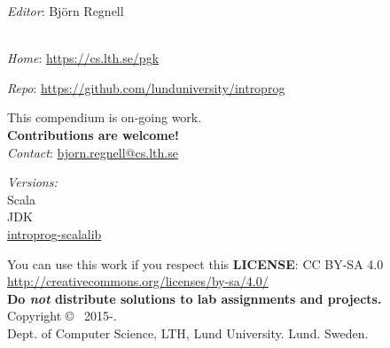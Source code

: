 
\clearpage\null\thispagestyle{empty}
\vfill

{
\setlength{\parindent}{0pt}
\emph{Editor}: Björn Regnell \\


\\ \newline

\emph{Home}: \url{https://cs.lth.se/pgk} \newline

\emph{Repo}: \url{https://github.com/lunduniversity/introprog} \\ \newline

This compendium is on-going work. \\ \textbf{Contributions are welcome!} \\
\emph{Contact}: \url{bjorn.regnell@cs.lth.se}
\\ \newline


\emph{Versions:} \\
Scala \ScalaVersion \\
JDK \JDKVersion\\
\href{https://github.com/lunduniversity/introprog-scalalib/}{introprog-scalalib} \LibVersion \\ 

\vfill

You can use this work if you respect this \textbf{LICENSE}: CC BY-SA 4.0 \\
\url{http://creativecommons.org/licenses/by-sa/4.0/} \\
\textbf{Do \emph{not} distribute solutions to lab assignments and projects.}
\\ \newline
Copyright \copyright~ 2015-\CurrentYear. \\
Dept. of Computer Science, LTH, Lund University. Lund. Sweden.\\
}
